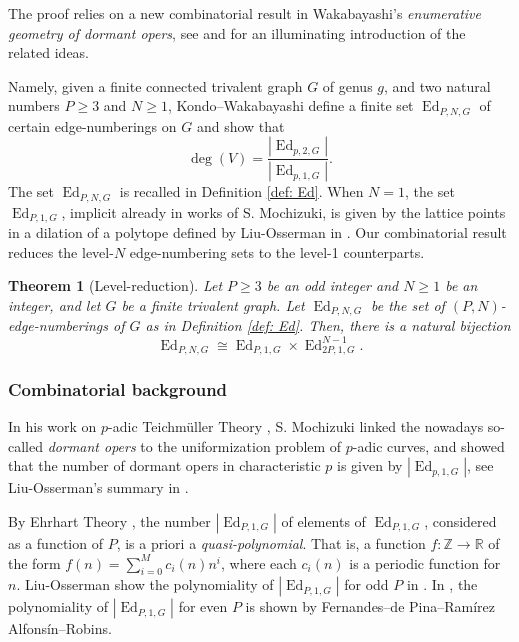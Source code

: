 \documentclass[11pt]{amsart}
\newtheorem{theorem}{Theorem}
\newcommand{\Ed}{\operatorname{Ed}}
\begin{document}
The proof relies on a new combinatorial result in Wakabayashi's \textit{enumerative geometry of
dormant opers}, see \cite{WakSpin} and
\cite[\S1]{WakTQFT} for an illuminating introduction of the related ideas.

Namely, given a finite connected trivalent graph $G$ of genus $g$, and two natural numbers $P\geq 3$ and $N\geq 1$, Kondo--Wakabayashi define a finite set  $\Ed_{P,N,G}$ of certain edge-numberings on $G$ and show that 
\begin{equation}\label{eqn: deg}
    \deg(V)=\frac{|\Ed_{p,2,G}|}{|\Ed_{p,1,G}|}.
\end{equation}
The set $\Ed_{P,N,G}$ is recalled in Definition \ref{def: Ed}.
When $N=1$, the set $\Ed_{P,1,G}$, implicit already in works of S. Mochizuki, is given by the lattice points in a dilation of a polytope defined by Liu-Osserman in \cite[Definition 2.3]{LO}. 
Our combinatorial result reduces the level-$N$ edge-numbering sets to the level-1 counterparts.

\begin{theorem}[Level-reduction]\label{thm: level-reduction}
    Let $P\geq 3$ be an odd integer and $N\geq 1$ be an integer, and let $G$ be a finite trivalent graph.
    Let $\Ed_{P,N,G}$ be the set of $(P,N)$-edge-numberings of $G$ as in Definition \ref{def: Ed}.
    Then, there is a natural bijection
    \[\Ed_{P,N,G}\cong \Ed_{P,1,G}\times \Ed_{2P,1,G}^{N-1}.\]
\end{theorem}

\subsubsection*{Combinatorial background}

In his work on $p$-adic Teichm\"uller Theory \cite{Moc}, S. Mochizuki linked the nowadays so-called \textit{dormant opers} to the uniformization problem of $p$-adic curves, and showed that the number of dormant opers in characteristic $p$ is given by $|\Ed_{p,1,G}|$, see Liu-Osserman's summary in \cite[Theorem 3.9]{LO}.

By Ehrhart Theory \cite[Theorem 4.6.8]{StanleyEC1}, the number $|\Ed_{P,1,G}|$ of elements of $\Ed_{P,1,G}$, considered as a function of $P$, is a priori a \textit{quasi-polynomial}.
That is, a function $f:\mathbb{Z}\to \mathbb{R}$ of the form $f(n)=\sum_{i=0}^M c_i(n) n^i$, where each $c_i(n)$ is a periodic function for $n$.
Liu-Osserman show the polynomiality of $|\Ed_{P,1,G}|$ for odd $P$ in \cite[Corollary 3.6]{LO}.
In \cite[Theorem 5]{FdPAR}, the polynomiality of $|\Ed_{P,1,G}|$ for even $P$ is shown by Fernandes--de Pina--Ramírez Alfonsín--Robins.
\end{document}
